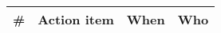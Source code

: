 \begin{longtable}{cXcc}
\toprule
\textbf{\#} & \textbf{Action item} & \textbf{When} & \textbf{Who}

\\ \bottomrule
\end{longtable}

